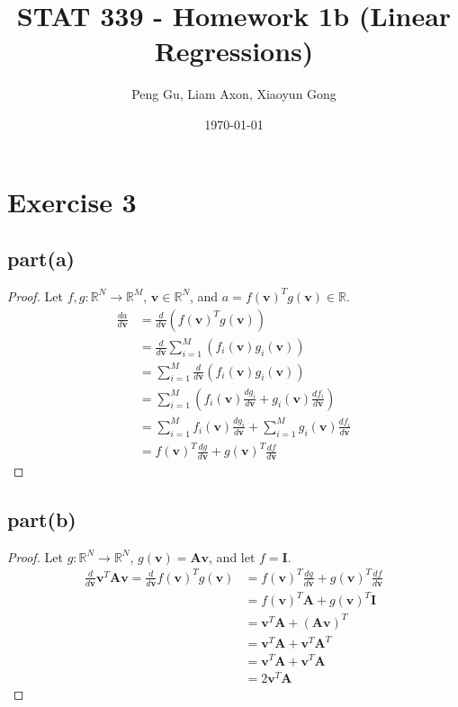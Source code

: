 \documentclass[12pt]{amsart}
\newcommand{\vect}[1]{\mathbf{#1}}
\begin{document}
\title[STAT339 - Machine Learning]{STAT 339 - Homework 1b (Linear Regressions)}

\author{Peng Gu, Liam Axon, Xiaoyun Gong} 
\date{\today}

\maketitle
\section*{Exercise 3}
\subsection*{part(a)}
\begin{proof}
Let $f,g:\mathbb{R}^N\to\mathbb{R}^M$,  $\vect{v}\in\mathbb{R}^N$, and $a = f(\vect{v})^T g(\vect{v})\in \mathbb{R}$.
\begin{align*}
    \frac{da}{d\vect{v}} &= \frac{d}{d\vect{v}}(f(\vect{v})^T g(\vect{v}))\\
    &= \frac{d}{d\vect{v}} \sum_{i=1}^M (f_i(\vect{v})g_i(\vect{v}))\\
    &= \sum_{i=1}^M \frac{d}{d\vect{v}}(f_i(\vect{v})g_i(\vect{v}))\\
    &= \sum_{i=1}^M (f_i(\vect{v})\frac{dg_i}{d\vect{v}}+g_i(\vect{v})\frac{df_i}{d\vect{v}})\\
    &= \sum_{i=1}^M f_i(\vect{v})\frac{dg_i}{d\vect{v}} +\sum_{i=1}^M g_i(\vect{v})\frac{df_i}{d\vect{v}}\\
    &= f(\vect{v})^T\frac{dg}{d\vect{v}} +g(\vect{v})^T\frac{df}{d\vect{v}}
\end{align*}
\end{proof}

\subsection*{part(b)}
\begin{proof}
Let $g:\mathbb{R}^N\to\mathbb{R}^N$, $g(\vect{v})=\vect{A}\vect{v}$, and let $f=\textbf{I}$.
\begin{align*}
    \frac{d}{d\vect{v}}\vect{v}^T\vect{A}\vect{v}
    = \frac{d}{d\vect{v}}f(\vect{v})^T g(\vect{v})
    &=f(\vect{v})^T \frac{dg}{d\vect{v}}
    + g(\vect{v})^T  \frac{df}{d\vect{v}}\\
    &= f(\vect{v})^T \vect{A}
    +g(\vect{v})^T\vect{I}\\
&= \vect{v}^T\vect{A}+(\vect{A}\vect{v})^T\\
&= \vect{v}^T\vect{A} + \vect{v}^T\vect{A}^T\\
&= \vect{v}^T\vect{A} + \vect{v}^T\vect{A}\\
&= 2\vect{v}^T\vect{A}
\end{align*}
\end{proof}
\end{document}
